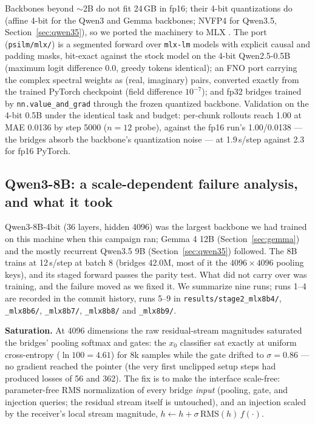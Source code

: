 \documentclass[11pt]{article}
\newcommand{\code}[1]{\texttt{#1}}
\begin{document}
Backbones beyond $\sim$2B do not fit 24\,GB in fp16; their 4-bit quantizations do (affine 4-bit for the Qwen3 and Gemma backbones; NVFP4 \citep{nvidia2025nvfp4} for Qwen3.5, Section~\ref{sec:qwen35}), so we ported the machinery to MLX \citep{hannun2023mlx}. The port (\code{psilm/mlx/}) is a segmented forward over \code{mlx-lm} models with explicit causal and padding masks, bit-exact against the stock model on the 4-bit Qwen2.5-0.5B (maximum logit difference $0.0$, greedy tokens identical); an FNO port carrying the complex spectral weights as (real, imaginary) pairs, converted exactly from the trained PyTorch checkpoint (field difference $10^{-7}$); and fp32 bridges trained by \code{nn.value\_and\_grad} through the frozen quantized backbone. Validation on the 4-bit 0.5B under the identical task and budget: per-chunk rollouts reach 1.00 at MAE 0.0136 by step 5000 ($n{=}12$ probe), against the fp16 run's 1.00/0.0138 --- the bridges absorb the backbone's quantization noise --- at 1.9\,s/step against 2.3 for fp16 PyTorch.

\subsection{Qwen3-8B: a scale-dependent failure analysis, and what it took}
\label{sec:scaling8b}

Qwen3-8B-4bit (36 layers, hidden 4096) was the largest backbone we had trained on this machine when this campaign ran; Gemma 4 12B (Section~\ref{sec:gemma}) and the mostly recurrent Qwen3.5 9B (Section~\ref{sec:qwen35}) followed. The 8B trains at 12\,s/step at batch 8 (bridges 42.0M, most of it the $4096\times4096$ pooling keys), and its staged forward passes the parity test. What did not carry over was training, and the failure moved as we fixed it. We summarize nine runs; runs 1--4 are recorded in the commit history, runs 5--9 in \code{results/stage2\_mlx8b4/}, \code{\_mlx8b6/}, \code{\_mlx8b7/}, \code{\_mlx8b8/} and \code{\_mlx8b9/}.

\textbf{Saturation.} At 4096 dimensions the raw residual-stream magnitudes saturated the bridges' pooling softmax and gates: the $x_0$ classifier sat exactly at uniform cross-entropy ($\ln 100 = 4.61$) for 8k samples while the gate drifted to $\sigma=0.86$ --- no gradient reached the pointer (the very first unclipped setup steps had produced losses of 56 and 362). The fix is to make the interface scale-free: parameter-free RMS normalization of every bridge \emph{input} (pooling, gate, and injection queries; the residual stream itself is untouched), and an injection scaled by the receiver's local stream magnitude, $h \leftarrow h + \sigma\,\mathrm{RMS}(h)\,f(\cdot)$.
\end{document}
